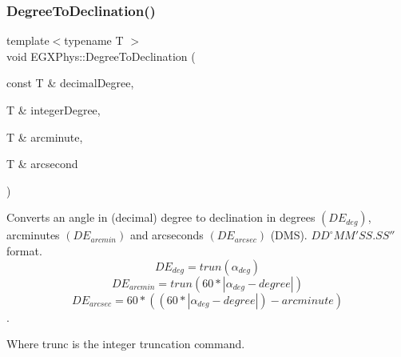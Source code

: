 \subsubsection{\texorpdfstring{Degree\+To\+Declination()}{DegreeToDeclination()}}
{\footnotesize\ttfamily template$<$typename T $>$ \\
void E\+G\+X\+Phys\+::\+Degree\+To\+Declination (\begin{DoxyParamCaption}\item[{const T \&}]{decimal\+Degree,  }\item[{T \&}]{integer\+Degree,  }\item[{T \&}]{arcminute,  }\item[{T \&}]{arcsecond }\end{DoxyParamCaption})}



Converts an angle in (decimal) degree to declination in degrees $(DE_{deg})$, arcminutes $(DE_{arcmin})$ and arcseconds $(DE_{arcsec})$ (D\+MS). ${DD}^{\circ}{MM}'{SS.SS}''$ format. \[DE_{deg}=trun(\alpha_{deg})\] \[DE_{arcmin}=trun(60 * |\alpha_{deg} - degree|)\] \[DE_{arcsec}=60 * ((60 * |\alpha_{deg} - degree|)-arcminute)\]. 

Where trunc is the integer truncation command.

